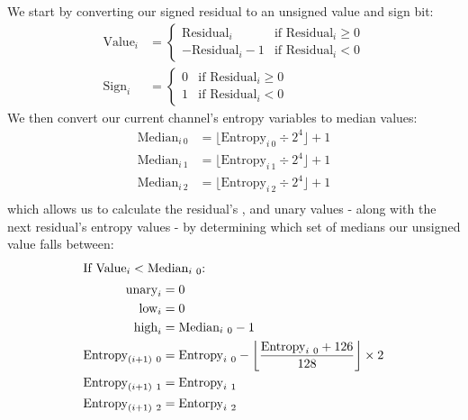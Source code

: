 We start by converting our signed residual to an unsigned value and sign bit:
\begin{align*}
\text{Value}_i &=
\begin{cases}
\text{Residual}_i & \text{if } \text{Residual}_i \geq 0 \\
-\text{Residual}_i - 1 & \text{if } \text{Residual}_i < 0
\end{cases} \\
\text{Sign}_i &=
\begin{cases}
0 & \text{if } \text{Residual}_i \geq 0 \\
1 & \text{if } \text{Residual}_i < 0
\end{cases}
\end{align*}
We then convert our current channel's entropy variables to
median values:
\begin{align*}
\text{Median}_{i~0} &= \lfloor\text{Entropy}_{i~0}\div2 ^ 4\rfloor + 1 \\
\text{Median}_{i~1} &= \lfloor\text{Entropy}_{i~1}\div2 ^ 4\rfloor + 1 \\
\text{Median}_{i~2} &= \lfloor\text{Entropy}_{i~2}\div2 ^ 4\rfloor + 1 \\
\end{align*}
which allows us to calculate the residual's , 
and unary values - along with the next residual's entropy values -
by determining which set of medians our unsigned value falls between:
\begin{align*}
\intertext{If $\text{Value}_i < \text{Median}_{i~0}$:}
\text{unary}_i &= 0 \\
\text{low}_i &= 0 \\
\text{high}_i &= \text{Median}_{i~0} - 1 \\
\text{Entropy}_{(i + 1)~0} &= \text{Entropy}_{i~0} - \left\lfloor\frac{\text{Entropy}_{i~0} + 126}{128}\right\rfloor \times 2 \\
\text{Entropy}_{(i + 1)~1} &= \text{Entropy}_{i~1} \\
\text{Entropy}_{(i + 1)~2} &= \text{Entorpy}_{i~2}
\end{align*}
\clearpage
